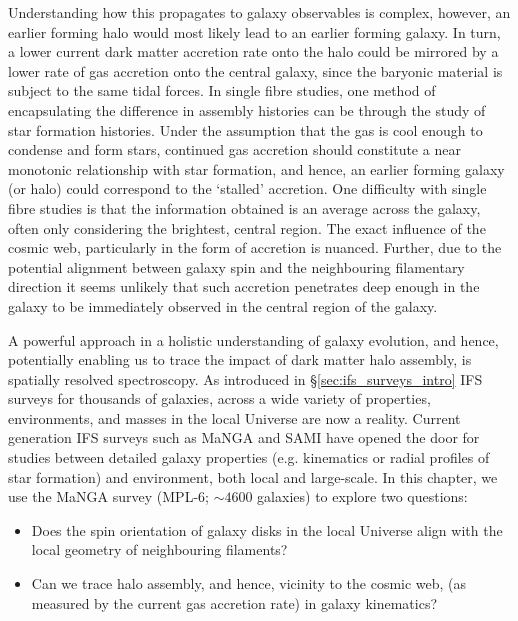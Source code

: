 Understanding how this propagates to galaxy observables is complex, however, an earlier forming halo would most likely lead to an earlier forming galaxy. In turn, a lower current dark matter accretion rate onto the halo could be mirrored by a lower rate of gas accretion onto the central galaxy, since the baryonic material is subject to the same tidal forces. In single fibre studies, one method of encapsulating the difference in assembly histories can be through the study of star formation histories. Under the assumption that the gas is cool enough to condense and form stars, continued gas accretion should constitute a near monotonic relationship with star formation, and hence, an earlier forming galaxy (or halo) could correspond to the `stalled' accretion.  One difficulty with single fibre studies is that the information obtained is an average across the galaxy, often only considering the brightest, central region. The exact influence of the cosmic web, particularly in the form of accretion is nuanced. Further, due to the potential alignment between galaxy spin and the neighbouring filamentary direction it seems unlikely that such accretion penetrates deep enough in the galaxy to be immediately observed in the central region of the galaxy. 

A powerful approach in a holistic understanding of galaxy evolution, and hence, potentially enabling us to trace the impact of dark matter halo assembly, is spatially resolved spectroscopy. As introduced in \S\ref{sec:ifs_surveys_intro} IFS surveys for thousands of galaxies, across a wide variety of properties, environments, and masses in the local Universe are now a reality. Current generation IFS surveys such as MaNGA and SAMI have opened the door for studies between detailed galaxy properties (e.g. kinematics or radial profiles of star formation) and environment, both local and large-scale. In this chapter, we use the MaNGA survey (MPL-6; $\sim 4600$ galaxies) to explore two questions:

\begin{itemize}
    \item Does the spin orientation of galaxy disks in the local Universe align with the local geometry of neighbouring filaments?
    \item Can we trace halo assembly, and hence, vicinity to the cosmic web, (as measured by the current gas accretion rate) in galaxy kinematics? 
\end{itemize}

